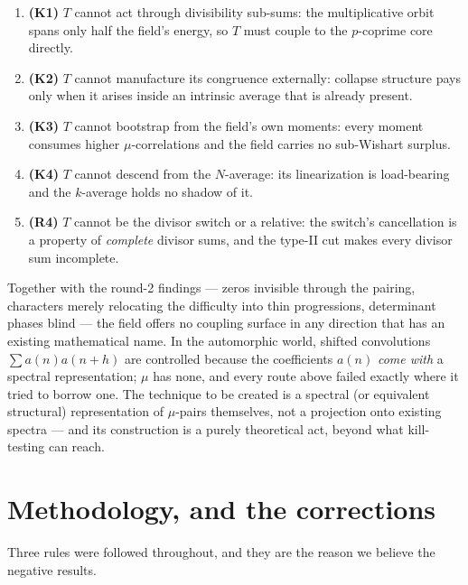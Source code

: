 \documentclass[11pt,a4paper]{article}
\theoremstyle{plain}
\theoremstyle{definition}
\begin{document}
\begin{enumerate}
\item \textbf{(K1)} $T$ cannot act through divisibility sub-sums: the
  multiplicative orbit spans only half the field's energy, so $T$ must
  couple to the $p$-coprime core directly.
\item \textbf{(K2)} $T$ cannot manufacture its congruence externally:
  collapse structure pays only when it arises inside an intrinsic
  average that is already present.
\item \textbf{(K3)} $T$ cannot bootstrap from the field's own moments:
  every moment consumes higher $\mu$-correlations and the field
  carries no sub-Wishart surplus.
\item \textbf{(K4)} $T$ cannot descend from the $N$-average: its
  linearization is load-bearing and the $k$-average holds no shadow
  of it.
\item \textbf{(R4)} $T$ cannot be the divisor switch or a relative:
  the switch's cancellation is a property of \emph{complete} divisor
  sums, and the type-II cut makes every divisor sum incomplete.
\end{enumerate}

\noindent
Together with the round-2 findings --- zeros invisible through the
pairing, characters merely relocating the difficulty into thin
progressions, determinant phases blind --- the field offers no
coupling surface in any direction that has an existing mathematical
name. In the automorphic world, shifted convolutions
$\sum a(n)a(n+h)$ are controlled because the coefficients $a(n)$
\emph{come with} a spectral representation; $\mu$ has none, and every
route above failed exactly where it tried to borrow one. The technique
to be created is a spectral (or equivalent structural) representation
of $\mu$-pairs themselves, not a projection onto existing spectra ---
and its construction is a purely theoretical act, beyond what
kill-testing can reach.

\section{Methodology, and the corrections}

Three rules were followed throughout, and they are the reason we
believe the negative results.
\end{document}
